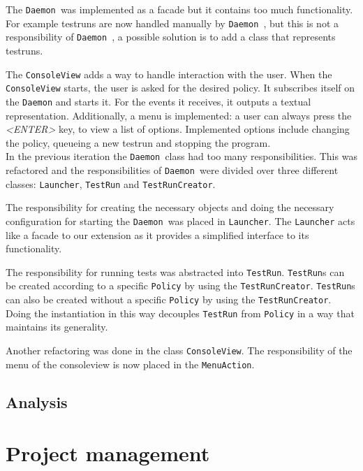 \documentclass[i3]{oss}
\newcommand{\class}[1]{\texttt{#1}}
\newcommand{\Daemon}{\class{Daemon  }}
\begin{document}
The \Daemon was implemented as a facade but it contains too much functionality.
For example testruns are now handled manually by \Daemon, but this is
not a responsibility of \Daemon, a possible solution is to add a class
that represents testruns.

The \class{ConsoleView} adds a way to handle interaction with the user. 
When the \class{ConsoleView} starts, the user is asked for the desired policy.
It subscribes itself on the \class{Daemon} and starts it. For the events it receives, it outputs a textual representation. 
Additionally, a menu is implemented: a user can always press the \emph{<ENTER>} key, to view a list of options. Implemented options include changing the policy, queueing a new testrun and stopping the program. \\


In the previous iteration the \Daemon class had too many responsibilities. 
This was refactored and the responsibilities of \Daemon were divided over three different classes: \class{Launcher}, \class{TestRun} and \class{TestRunCreator}.

The responsibility for creating the necessary objects and doing the necessary configuration for starting the \Daemon was placed in \class{Launcher}. 
The \class{Launcher} acts like a facade to our extension as it provides a simplified interface to its functionality.

The responsibility for running tests was abstracted into \class{TestRun}.
\class{TestRun}s can be created according to a specific \class{Policy} by using the \class{TestRunCreator}. \class{TestRun}s can also be created without a specific \class{Policy} by using the \class{TestRunCreator}.
Doing the instantiation in this way decouples \class{TestRun} from \class{Policy} in a way that maintains its generality. 

Another refactoring was done in the class \class{ConsoleView}. The responsibility of the menu of the consoleview is now placed in the \class{MenuAction}. 






\subsection{Analysis}
\label{ss:analyse}


\section{Project management}
\label{ssec:Projectmanag}
\end{document}
